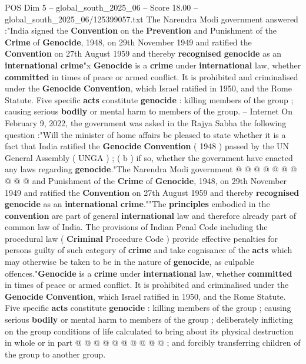 \begin{textsample}{POS Dim 5 – global\_south\_2025\_06 – Score 18.00 – global\_south\_2025\_06/125399057.txt}  \label{ex:f5_pos_054}
The Narendra Modi government answered :"India signed the \textbf{Convention} on the \textbf{Prevention} and Punishment of the \textbf{Crime} of \textbf{Genocide}, 1948, on 29th November 1949 and ratified the \textbf{Convention} on 27th August 1959 and thereby \textbf{recognised} \textbf{genocide} as an \textbf{international} \textbf{crime}"x \textbf{Genocide} is a \textbf{crime} under \textbf{international} law, whether \textbf{committed} in times of peace or armed conflict.
It is prohibited and criminalised under the \textbf{Genocide} \textbf{Convention}, which Israel ratified in 1950, and the Rome Statute.
Five specific \textbf{acts} constitute \textbf{genocide} : killing members of the group ; causing serious \textbf{bodily} or mental harm to members of the group. -- Internet On February 9, 2022, the government was asked in the Rajya Sabha the following question :"Will the minister of home affairs be pleased to state whether it is a fact that India ratified the \textbf{Genocide} \textbf{Convention} ( 1948 ) passed by the UN General Assembly ( UNGA ) ; ( b ) if so, whether the government have enacted any laws regarding \textbf{genocide}."The Narendra Modi government @ @ @ @ @ @ @ @ @ @ and Punishment of the \textbf{Crime} of \textbf{Genocide}, 1948, on 29th November 1949 and ratified the \textbf{Convention} on 27th August 1959 and thereby \textbf{recognised} \textbf{genocide} as an \textbf{international} \textbf{crime}.""The \textbf{principles} embodied in the \textbf{convention} are part of general \textbf{international} law and therefore already part of common law of India.
The provisions of Indian Penal Code including the procedural law ( \textbf{Criminal} Procedure Code ) provide effective penalties for persons guilty of such category of \textbf{crime} and take cognisance of the \textbf{acts} which may otherwise be taken to be in the nature of \textbf{genocide}, as culpable offences."\textbf{Genocide} is a \textbf{crime} under \textbf{international} law, whether \textbf{committed} in times of peace or armed conflict.
It is prohibited and criminalised under the \textbf{Genocide} \textbf{Convention}, which Israel ratified in 1950, and the Rome Statute.
Five specific \textbf{acts} constitute \textbf{genocide} : killing members of the group ; causing serious \textbf{bodily} or mental harm to members of the group ; deliberately inflicting on the group conditions of life calculated to bring about its physical destruction in whole or in part @ @ @ @ @ @ @ @ @ @ ; and forcibly transferring children of the group to another group.

\end{textsample}
